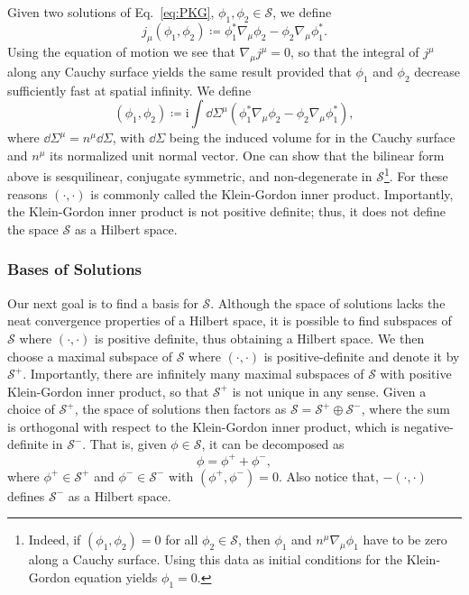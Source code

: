 \documentclass[letterpaper,12pt,titlepage,oneside,final]{book}
\renewcommand{\S}{\mathcal{S}}
\newcommand{\ii}{\mathrm{i}}
\begin{document}
Given two solutions of Eq.~\eqref{eq:PKG}, $\phi_1,\phi_2\in\S$, we define
\begin{equation}
    j_\mu(\phi_1,\phi_2) \coloneqq \phi_1^* \nabla_\mu \phi_2 - \phi_2\nabla_\mu \phi_1^*.
\end{equation}
Using the equation of motion we see that $\nabla_\mu j^\mu = 0$, so that the integral of $j^\mu$ along any Cauchy surface yields the same result provided that $\phi_1$ and $\phi_2$ decrease sufficiently fast at spatial infinity. We define
\begin{equation}
    (\phi_1,\phi_2) \coloneqq \ii \int \dd \Sigma^\mu (\phi_1^* \nabla_\mu \phi_2 - \phi_2\nabla_\mu \phi_1^*),
\end{equation}
where $\dd \Sigma^\mu = n^\mu \dd \Sigma$, with $\dd \Sigma$ being the induced volume for in the Cauchy surface and $n^\mu$ its normalized unit normal vector. One can show that the bilinear form above is sesquilinear, conjugate symmetric, and non-degenerate in $\mathcal{S}$\footnote{Indeed, if $(\phi_1,\phi_2) = 0$ for all $\phi_2\in\S$, then $\phi_1$ and $n^\mu \nabla_\mu \phi_1$ have to be zero along a Cauchy surface. Using this data as initial conditions for the Klein-Gordon equation yields $\phi_1 = 0$.}. For these reasons $(\cdot,\cdot)$ is commonly called the Klein-Gordon inner product. Importantly, the Klein-Gordon inner product is not positive definite; thus, it does not define the space $\S$ as a Hilbert space. 



\subsubsection*{Bases of Solutions}

Our next goal is to find a basis for $\mathcal{S}$. Although the space of solutions lacks the neat convergence properties of a Hilbert space, it is possible to find subspaces of $\S$ where $(\cdot,\cdot)$ is positive definite, thus obtaining a Hilbert space. We then choose a maximal subspace of $\S$ where $(\cdot, \cdot)$ is positive-definite and denote it by $\S^+$. Importantly, there are infinitely many maximal subspaces of $\S$ with positive Klein-Gordon inner product, so that $\S^+$ is not unique in any sense. Given a choice of $\S^+$, the space of solutions then factors as $\S = \S^+\oplus \S^-$, where the sum is orthogonal with respect to the Klein-Gordon inner product, which is negative-definite in $\mathcal{S}^-$. That is, given $\phi\in \mathcal{S}$, it can be decomposed as
\begin{equation}
    \phi = \phi^+ + \phi^-,
\end{equation}
where $\phi^+\in\S^+$ and $\phi^-\in \S^-$ with $(\phi^+,\phi^-) = 0$. Also notice that, $- (\cdot,\cdot)$ defines $\mathcal{S}^-$ as a Hilbert space.
\end{document}
